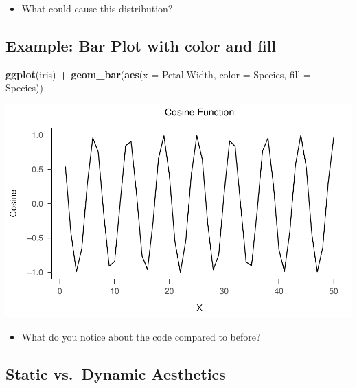 \documentclass[
]{book}
\newenvironment{Shaded}{\begin{snugshade}}{\end{snugshade}}
\newcommand{\AttributeTok}[1]{\textcolor[rgb]{0.13,0.29,0.53}{#1}}
\newcommand{\FunctionTok}[1]{\textcolor[rgb]{0.13,0.29,0.53}{\textbf{#1}}}
\newcommand{\NormalTok}[1]{#1}
\newcommand{\SpecialCharTok}[1]{\textcolor[rgb]{0.81,0.36,0.00}{\textbf{#1}}}
\providecommand{\tightlist}{%
  \setlength{\itemsep}{0pt}\setlength{\parskip}{0pt}}
\begin{document}
\begin{itemize}
\tightlist
\item
  What could cause this distribution?
\end{itemize}

\subsection{Example: Bar Plot with color and fill}\label{example-bar-plot-with-color-and-fill-1}

\begin{Shaded}
\begin{Highlighting}[]
\FunctionTok{ggplot}\NormalTok{(iris) }\SpecialCharTok{+} 
  \FunctionTok{geom\_bar}\NormalTok{(}\FunctionTok{aes}\NormalTok{(}\AttributeTok{x =}\NormalTok{ Petal.Width, }\AttributeTok{color =}\NormalTok{ Species, }\AttributeTok{fill =}\NormalTok{ Species))}
\end{Highlighting}
\end{Shaded}

\begin{flushleft}\includegraphics{_main_files/figure-latex/unnamed-chunk-46-1} \end{flushleft}

\begin{itemize}
\tightlist
\item
  What do you notice about the code compared to before?
\end{itemize}

\subsection{Static vs.~Dynamic Aesthetics}\label{static-vs.-dynamic-aesthetics}
\end{document}
